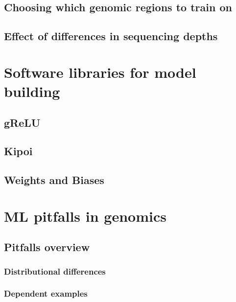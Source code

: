 \documentclass[
]{book}
\begin{document}
\chapter{Choosing which genomic regions to train on}\label{choosing-which-genomic-regions-to-train-on}

\chapter{Effect of differences in sequencing depths}\label{effect-of-differences-in-sequencing-depths}

\part{Software libraries for model building}\label{part-software-libraries-for-model-building}

\chapter{gReLU}\label{grelu}

\chapter{Kipoi}\label{kipoi}

\chapter{Weights and Biases}\label{weights-and-biases}

\part{ML pitfalls in genomics}\label{part-ml-pitfalls-in-genomics}

\chapter{Pitfalls overview}\label{pitfalls-overview}

\section{Distributional differences}\label{distributional-differences}

\section{Dependent examples}\label{dependent-examples}
\end{document}

